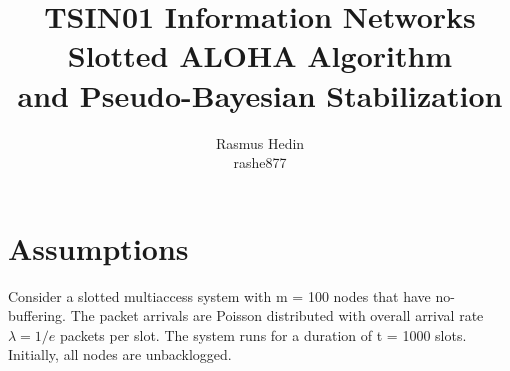 \documentclass{article}
\begin{document}
\title{%
  TSIN01 Information Networks \\
  \large Slotted ALOHA Algorithm \\
  and Pseudo-Bayesian Stabilization}
\author{Rasmus Hedin \\
rashe877}

\maketitle

\section{Assumptions}
Consider a slotted multiaccess system with m = 100 nodes that have no-buffering. The packet arrivals are Poisson distributed with overall arrival rate $\lambda = 1/e$ packets per slot. The system runs for a duration of t = 1000 slots. Initially, all nodes are unbacklogged.
\end{document}
